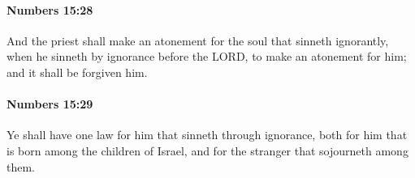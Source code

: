 		\paragraph{Numbers 15:28} %
			\label{NUMBERS-15-28}

			And the priest shall make an atonement for the soul that sinneth ignorantly, when he sinneth by ignorance before the LORD, to make an atonement for him; and it shall be forgiven him.


		\paragraph{Numbers 15:29} %
			\label{NUMBERS-15-29}

			Ye shall have one law for him that sinneth through ignorance, both for him that is born among the children of Israel, and for the stranger that sojourneth among them.


